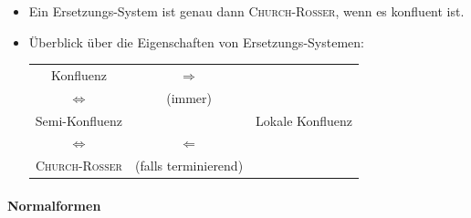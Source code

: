 \documentclass[
  a4paper,
  11pt,
]{scrartcl}
\begin{document}
\begin{itemize}
  \item Ein Ersetzungs-System ist genau dann \textsc{Church-Rosser}, wenn es
    konfluent ist.

  \item Überblick über die Eigenschaften von Ersetzungs-Systemen:
    \begin{center}
      \begin{tabular}{c|c|c}
        Konfluenz & $\Rightarrow$ & \\
        $\Leftrightarrow$ & (immer) & \\
        Semi-Konfluenz & & Lokale Konfluenz\\
        $\Leftrightarrow$ & $\Leftarrow$ & \\
        \textsc{Church-Rosser} & (falls terminierend) &
      \end{tabular}
    \end{center}
\end{itemize}

\paragraph{Normalformen}
\label{par:normalformen}
\end{document}
